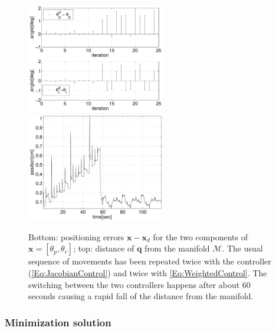\documentclass[conference]{IEEEtran}
\numberwithin{equation}{section}
\newcommand{\q}{\mathbf{q}}
\newcommand{\x}{\mathbf{x}}
\begin{document}
\begin{figure}[tbp]
\centering 
\includegraphics[width=60mm]{image/ErrorsJacobianAndComprormise.pdf} 
\includegraphics[width=60mm]{image/ManifoldDistanceJacobianAndComprormise.pdf} 
\caption{Bottom: positioning errors $\x - \x_d$ for the two components of $\x = [\theta_p, \theta_r]$; top: distance of $\q$ from the manifold $\mathcal M$. The usual sequence of movements has been repeated twice with the controller (\ref{Eq:JacobianControl}) and twice with \eqref{Eq:WeightedControl}. The switching between the two controllers happens after about 60 seconds causing a rapid fall of the distance from the manifold.} 
\label{Fig:ManifoldDistanceJacobianAndCompromise}
\end{figure}

\subsubsection{Minimization solution} \label{Sec:MinimizationSolution}
\end{document}
